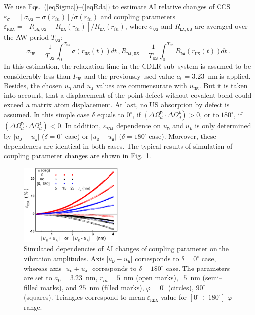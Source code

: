 \documentclass[aip,jap, amsmath,amssymb,reprint]{revtex4-1}
\begin{document}
We use Eqs.~(\ref{eqSigma})--(\ref{eqRda}) to estimate AI relative changes of CCS
$\varepsilon_\sigma=[\sigma_{\mathtt{US}}-\sigma(r_{in})]/\sigma(r_{in})$
and coupling parameters $\varepsilon_{\mathtt{RDA}}=[R_{\mathtt{DA,US}}-R_\mathtt{DA}(r_{in})]/R_\mathtt{DA}(r_{in})$,
where $\sigma_{\mathtt{US}}$ and $R_{\mathtt{DA,US}}$ are averaged over the AW period $T_\mathtt{US}$:
\begin{equation*}
\label{eqAver}
\sigma_{\mathtt{US}}=\frac{1}{T_\mathtt{US}}\int^{T_\mathtt{US}}_0\!\!\!\!\!\!\sigma(r_\mathtt{US}(t))dt\,,
R_{\mathtt{DA,US}}=\frac{1}{T_\mathtt{US}}\int^{T_\mathtt{US}}_0\!\!\!\!\!\!R_{\mathtt{DA}}(r_\mathtt{US}(t))dt\,.
\end{equation*}
In this estimation, the relaxation time in the CDLR sub--system is assumed to be considerably less than $T_\mathtt{US}$
and the previously used\cite{CDLR:JAP} value $a_0=3.23$~nm is applied.
Besides, the chosen $u_\mathtt{D}$ and $u_\mathtt{A}$ values are commensurate with $u_\mathtt{US}$.
But it is taken into account, that a displacement of the point defect without covalent bond could exceed a matrix atom displacement.
At last, no US  absorption by defect is assumed.
In this simple case $\delta$ equals to $0^\circ$, if $(\Delta\Omega_d^\mathtt{D}\cdot\Delta\Omega_d^\mathtt{A})>0$,
or to $180^\circ$, if $(\Delta\Omega_d^\mathtt{D}\cdot\Delta\Omega_d^\mathtt{A})<0$.
In addition, $\varepsilon_{\mathtt{RDA}}$ dependence on
$u_\mathtt{D}$ and $u_\mathtt{A}$
is only determined by $|u_\mathtt{D}-u_\mathtt{A}|$ ($\delta=0^\circ$ case) or $|u_\mathtt{D}+u_\mathtt{A}|$ ($\delta=180^\circ$ case).
Moreover, these dependences are identical in both cases.
The typical results of simulation of coupling parameter changes are shown in  Fig.~\ref{fig_Erda}.


\begin{figure}
\includegraphics[width=0.45\textwidth]{fig_6}%
\caption{\label{fig_Erda}
Simulated dependencies of AI changes of coupling parameter on the vibration amplitudes.
Axis $|u_\mathtt{D}-u_\mathtt{A}|$ corresponds to $\delta=0^\circ$ case, whereas axis $|u_\mathtt{D}+u_\mathtt{A}|$ corresponds to $\delta=180^\circ$ case.
The parameters are set to $a_0=3.23$~nm,
$r_{in}=5$~nm (open marks), $15$~nm (semi--filled marks), and $25$~nm (filled marks),
$\varphi=0^\circ$ (circles), $90^\circ$ (squares).
Triangles correspond to mean $\varepsilon_{\mathtt{RDA}}$ value for $[0^\circ\div 180^\circ]$ $\varphi$ range.
}%
\end{figure}
\end{document}
